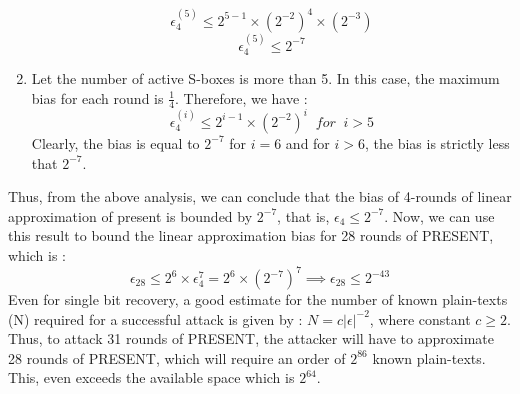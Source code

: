 \documentclass[preprint]{transcrypto}
\begin{document}
\begin{enumerate}
\begin{equation*}
        \epsilon_4^{(5)} \leq 2^{5-1} \times (2^{-2})^4 \times (2^{-3})
    \end{equation*}
    \begin{equation*}
        \epsilon_4^{(5)} \leq 2^{-7} 
    \end{equation*}
    \item Let the number of active S-boxes is more than 5. In this case, the maximum bias for each round is $\frac{1}{4}$. Therefore, we have : 
    \begin{equation*}
        \epsilon_4^{(i)} \leq 2^{i-1} \times (2^{-2})^i \;\; for \;\; i > 5
    \end{equation*}
    Clearly, the bias is equal to $2^{-7}$ for $i = 6$ and for $i > 6$, the bias is strictly less that $2^{-7}$. 
\end{enumerate}
Thus, from the above analysis, we can conclude that the bias of 4-rounds of linear approximation of present is bounded by $2^{-7}$, that is, $\epsilon_4 \leq 2^{-7}$. Now, we can use this result to bound the linear approximation bias for 28 rounds of PRESENT, which is :
\begin{equation*}
    \epsilon_{28} \leq 2^{6} \times \epsilon_4^{7} = 2^6 \times (2^{-7})^7 \implies \epsilon_{28} \leq 2^{-43}
\end{equation*}
Even for single bit recovery, a good estimate for the number of known plain-texts (N) required for a successful attack is given by : $N = c|\epsilon|^{-2}$, where constant $c \geq 2$. Thus, to attack 31 rounds of PRESENT, the attacker will have to approximate 28 rounds of PRESENT, which will require an order of $2^{86}$ known plain-texts. This, even exceeds the available space which is $2^{64}$. 
\end{document}
